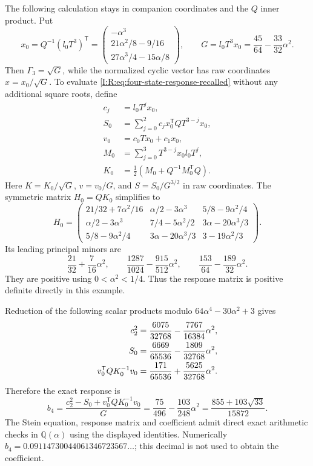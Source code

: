 The following calculation stays in companion coordinates and the
$Q$ inner product.  Put
\[
 x_0=Q^{-1}(l_0T^3)^{\mathsf T}
 =\begin{pmatrix}
 -\alpha^3\\21\alpha^2/8-9/16\\27\alpha^3/4-15\alpha/8
 \end{pmatrix},\qquad
 G=l_0T^3x_0=\frac{45}{64}-\frac{33}{32}\alpha^2.
\]
Then $\Gamma_3=\sqrt G$, while the normalized cyclic vector has raw
coordinates $x=x_0/\sqrt G$.
To evaluate \eqref{I:R:eq:four-state-response-recalled} without any
additional square roots, define
\begin{align*}
 c_j&=l_0T^jx_0,\\
 S_0&=\sum_{j=0}^{2}c_jx_0^{\mathsf T}QT^{3-j}x_0,\\
 v_0&=c_0Tx_0+c_1x_0,\\
 M_0&=\sum_{j=0}^{3}T^{3-j}x_0l_0T^j,\\
 K_0&=\tfrac12(M_0+Q^{-1}M_0^{\mathsf T}Q).
\end{align*}
Here $K=K_0/\sqrt G$, $v=v_0/G$, and $S=S_0/G^{3/2}$ in raw
coordinates.  The symmetric matrix $H_0=QK_0$ simplifies to
\begin{equation}
 H_0=\begin{pmatrix}
 21/32+7\alpha^2/16&\alpha/2-3\alpha^3&5/8-9\alpha^2/4\\
 \alpha/2-3\alpha^3&7/4-5\alpha^2/2&3\alpha-20\alpha^3/3\\
 5/8-9\alpha^2/4&3\alpha-20\alpha^3/3&3-19\alpha^2/3
 \end{pmatrix}.
 \label{I:R:eq:four-state-H0}
\end{equation}
Its leading principal minors are
\[
 \frac{21}{32}+\frac7{16}\alpha^2,\qquad
 \frac{1287}{1024}-\frac{915}{512}\alpha^2,\qquad
 \frac{153}{64}-\frac{189}{32}\alpha^2.
\]
They are positive using $0<\alpha^2<1/4$.  Thus the response matrix
is positive definite directly in this example.

Reduction of the following scalar products modulo
$64\alpha^4-30\alpha^2+3$ gives
\begin{align}
 c_2^2&=\frac{6075}{32768}-\frac{7767}{16384}\alpha^2,\notag\\
 S_0&=\frac{6669}{65536}-\frac{1809}{32768}\alpha^2,\notag\\
 v_0^{\mathsf T}QK_0^{-1}v_0
 &=\frac{171}{65536}+\frac{5625}{32768}\alpha^2.
 \label{I:R:eq:four-state-scalar-certificate}
\end{align}
Therefore the exact response is
\begin{equation}
 b_4=\frac{c_2^2-S_0+v_0^{\mathsf T}QK_0^{-1}v_0}{G}
    =\frac{75}{496}-\frac{103}{248}\alpha^2
    =\boxed{\frac{855+103\sqrt{33}}{15872}}.
 \label{I:R:eq:four-state-b4}
\end{equation}
The Stein equation, response matrix and coefficient admit direct exact
arithmetic checks in $\mathbb Q(\alpha)$ using the displayed identities.
Numerically $b_4=0.09114730044061346723567\ldots$; this decimal is
not used to obtain the coefficient.

